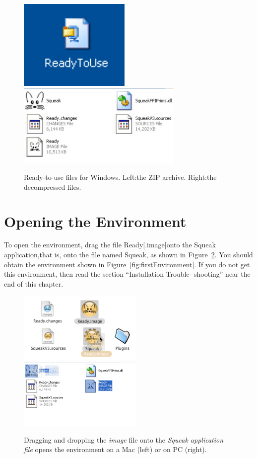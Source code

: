 \documentclass[a4paper,10pt,twoside]{book}
\begin{document}
\begin{figure}[h]\centerline{\includegraphics{3-zipPC}\includegraphics[width=8cm]{4-readyPC}} 
\caption{Ready-to-use files for Windows. Left:the ZIP archive. Right:the decompressed files. \label{fig:pcfiles}}
\end{figure}


\section{Opening the Environment}

To open the environment, drag the file Ready[.image]onto the Squeak application,that is, 
onto the file named Squeak, as shown in Figure~\ref{fig:dropImage}. You should obtain the environment shown 
in Figure~\ref{fig:firstEnvironment}. If you do not get this environment, then read the section “Installation Trouble- 
shooting” near the end of this chapter. 


\begin{figure}[!h]\centerline{\includegraphics[width=6cm]{5-dropImage2} \hfill{ \  } \includegraphics[width=6cm]{6-readyDD}} 
\caption{Dragging and dropping the \textit{image} file onto the 
\textit{Squeak application file}  opens the environment on a Mac (left) or on PC (right).\label{fig:dropImage}}
\end{figure}
\end{document}
